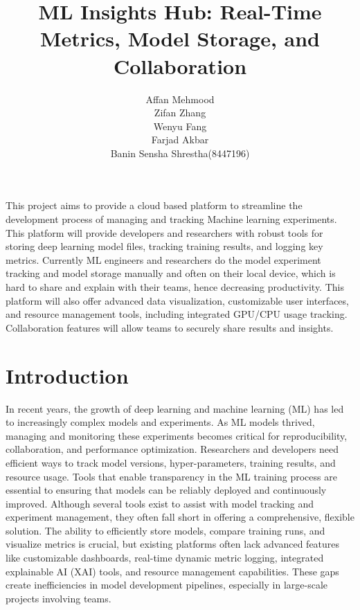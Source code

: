 \documentclass[12pt]{article}
\begin{document}
\title{ML Insights Hub: Real-Time Metrics, Model Storage, and Collaboration}


\author{
Affan Mehmood\\
Zifan Zhang\\
Wenyu Fang\\
Farjad Akbar\\
Banin Sensha Shrestha(8447196)\\
}




\maketitle {}

\abstract This project aims to provide a cloud based platform to streamline the development process of managing and tracking Machine learning experiments. This platform will provide developers and researchers with robust tools for storing deep learning model files, tracking training results, and logging key metrics. Currently ML engineers and researchers do the model experiment tracking and model storage manually and often on their local device, which is hard to share and explain with their teams, hence decreasing productivity. This platform will also offer advanced data visualization, customizable user interfaces, and resource management tools, including integrated GPU/CPU usage tracking. Collaboration features will allow teams to securely share results and insights.

\section{Introduction}

In recent years, the growth of deep learning and machine learning (ML) has led to increasingly complex models and experiments. As ML models thrived, managing and monitoring these experiments becomes critical for reproducibility, collaboration, and performance optimization. Researchers and developers need efficient ways to track model versions, hyper-parameters, training results, and resource usage\cite{derakhshan2019continuous}. Tools that enable transparency in the ML training process are essential to ensuring that models can be reliably deployed and continuously improved\cite{karamitsos2020applying}. 
Although several tools exist to assist with model tracking and experiment management, they often fall short in offering a comprehensive, flexible solution. The ability to efficiently store models, compare training runs, and visualize metrics is crucial, but existing platforms often lack advanced features like customizable dashboards, real-time dynamic metric logging, integrated explainable AI (XAI) tools, and resource management capabilities\cite{spjuth2021machine}. These gaps create inefficiencies in model development pipelines, especially in large-scale projects involving teams.
\end{document}
